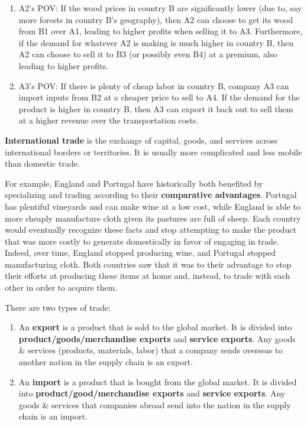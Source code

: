 \documentclass{article}
\begin{document}
    \begin{enumerate}
      \item A2's POV: If the wood prices in country B are significantly lower (due to, say more forests in country B's geography), then A2 can choose to get its wood from B1 over A1, leading to higher profits when selling it to A3. Furthermore, if the demand for whatever A2 is making is much higher in country B, then A2 can choose to sell it to B3 (or possibly even B4) at a premium, also leading to higher profits.
      \item A3's POV: If there is plenty of cheap labor in country B, company A3 can import inputs from B2 at a cheaper price to sell to A4. If the demand for the product is higher in country B, then A3 can export it back out to sell them at a higher revenue over the transportation costs.
    \end{enumerate}

    \begin{center}
    \end{center}

    \textbf{International trade} is the exchange of capital, goods, and services across international borders or territories. It is usually more complicated and less mobile than domestic trade.

    For example, England and Portugal have historically both benefited by specializing and trading according to their \textbf{comparative advantages}. Portugal has plentiful vineyards and can make wine at a low cost, while England is able to more cheaply manufacture cloth given its pastures are full of sheep. Each country would eventually recognize these facts and stop attempting to make the product that was more costly to generate domestically in favor of engaging in trade. Indeed, over time, England stopped producing wine, and Portugal stopped manufacturing cloth. Both countries saw that it was to their advantage to stop their efforts at producing these items at home and, instead, to trade with each other in order to acquire them.

    There are two types of trade:
    \begin{enumerate}
      \item An \textbf{export} is a product that is sold to the global market. It is divided into \textbf{product/goods/merchandise exports} and \textbf{service exports}. Any goods \& services (products, materials, labor) that a company sends overseas to another nation in the supply chain is an export.
      \item An \textbf{import} is a product that is bought from the global market. It is divided into \textbf{product/good/merchandise exports} and \textbf{service exports}. Any goods \& services that companies abroad send into the nation in the supply chain is an import.
    \end{enumerate}
\end{document}
